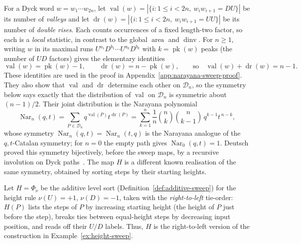 \documentclass[11pt]{article}
\theoremstyle{definition}
\newcommand{\D}{\mathcal D}
\newcommand{\area}{\operatorname{area}}
\newcommand{\dinv}{\operatorname{dinv}}
\newcommand{\val}{\operatorname{val}}
\newcommand{\dr}{\operatorname{dr}}
\newcommand{\pk}{\operatorname{pk}}
\newcommand{\Nar}{\operatorname{Nar}}
\begin{document}
For a Dyck word $w=w_1\cdots w_{2n}$, let
$\val(w)=|\{i:1\le i<2n,\ w_iw_{i+1}=DU\}|$ be its number of
\emph{valleys} and let
$\dr(w)=|\{i:1\le i<2n,\ w_iw_{i+1}=UU\}|$ be its number of
\emph{double rises}.  Each counts occurrences of a fixed length-two factor, so
each is a \emph{local} statistic, in contrast to the global $\area$ and $\dinv$.
For $n\ge 1$, writing $w$ in its maximal runs
$U^{a_1}D^{b_1}\cdots U^{a_k}D^{b_k}$ with $k=\pk(w)$ peaks (the number of $UD$
factors) gives the elementary identities
\[
   \val(w)=\pk(w)-1,\qquad \dr(w)=n-\pk(w),\qquad
   \text{so}\quad \val(w)+\dr(w)=n-1.
\]
These identities are used in the proof in
Appendix~\ref{app:narayana-sweep-proof}.  They also show that $\val$ and $\dr$
determine each other on $\D_n$, so the symmetry below says exactly that the
distribution of $\val$ on $\D_n$ is symmetric about $(n-1)/2$.
Their joint distribution is the Narayana polynomial
\[
   \Nar_n(q,t)=\sum_{P\in\D_n}q^{\val(P)}t^{\dr(P)}
   =\sum_{k=1}^{n}\frac1n\binom nk\binom n{k-1}\,q^{k-1}t^{\,n-k},
\]
whose symmetry $\Nar_n(q,t)=\Nar_n(t,q)$ is the Narayana analogue of the
$q,t$-Catalan symmetry; for $n=0$ the empty path gives $\Nar_0(q,t)=1$.
Deutsch proved this symmetry bijectively, before the sweep maps, by a
recursive involution on Dyck paths~\cite{Deutsch1999}.  The map $H$ is a
different known realisation of the same symmetry, obtained by sorting steps by
their starting heights.

Let $H=\Phi_\nu$ be the additive level sort
(Definition~\ref{def:additive-sweep}) for the height rule $\nu(U)=+1$,
$\nu(D)=-1$, taken with the \emph{right-to-left} tie-order: $H(P)$ lists the
steps of $P$ by increasing starting height (the height of $P$ just before the
step), breaks ties between equal-height steps by decreasing input position, and
reads off their $U/D$ labels.  Thus, $H$ is the right-to-left version of the
construction in Example~\ref{ex:height-sweep}.
\end{document}
